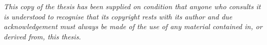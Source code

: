 

\begin{unicopyright}
\textit{This copy of the thesis has been supplied on condition that anyone who consults it is understood to recognise that its copyright rests with its author and due acknowledgement must always be made of the use of any material contained in, or derived from, this thesis.}
\end{unicopyright}
